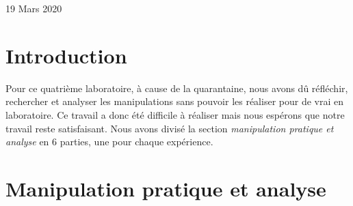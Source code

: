 \documentclass[a4paper]{article}
\begin{document}
\begin{titlepage}
\begin{sffamily}
\begin{center}
            {\large 19 Mars 2020}
        \end{center}
    \end{sffamily}
\end{titlepage}







\let\cleardoublepage\clearpage















\section{Introduction}





Pour ce quatrième laboratoire, à cause de la quarantaine, nous avons dû réfléchir, rechercher et analyser les manipulations sans pouvoir les réaliser pour de vrai en laboratoire. Ce travail a donc été difficile à réaliser mais nous espérons que notre travail reste satisfaisant. Nous avons divisé la section \textit{manipulation pratique et analyse} en 6 parties, une pour chaque expérience.






























\section{Manipulation pratique et analyse}
\end{document}
